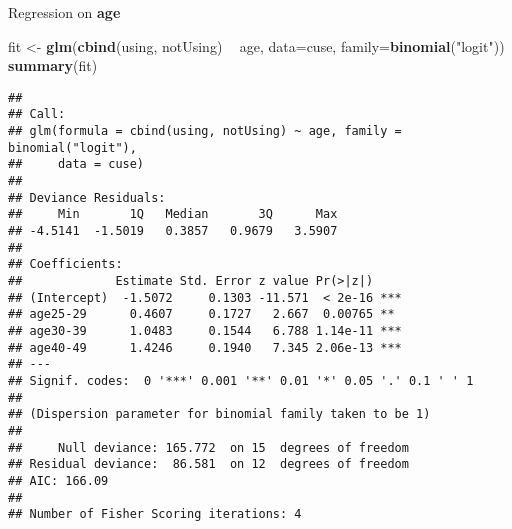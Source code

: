 \documentclass[
  ignorenonframetext,
]{beamer}
\newenvironment{Shaded}{\begin{snugshade}}{\end{snugshade}}
\newcommand{\DataTypeTok}[1]{\textcolor[rgb]{0.13,0.29,0.53}{#1}}
\newcommand{\KeywordTok}[1]{\textcolor[rgb]{0.13,0.29,0.53}{\textbf{#1}}}
\newcommand{\NormalTok}[1]{#1}
\newcommand{\OperatorTok}[1]{\textcolor[rgb]{0.81,0.36,0.00}{\textbf{#1}}}
\newcommand{\StringTok}[1]{\textcolor[rgb]{0.31,0.60,0.02}{#1}}
\begin{document}
\begin{frame}[fragile]{Regression on \textbf{age}}
\protect\hypertarget{regression-on-age-1}{}

\tiny

\begin{Shaded}
\begin{Highlighting}[]
\NormalTok{fit <-}\StringTok{ }\KeywordTok{glm}\NormalTok{(}\KeywordTok{cbind}\NormalTok{(using, notUsing) }\OperatorTok{~}\StringTok{ }\NormalTok{age, }
           \DataTypeTok{data=}\NormalTok{cuse, }\DataTypeTok{family=}\KeywordTok{binomial}\NormalTok{(}\StringTok{"logit"}\NormalTok{))}
\KeywordTok{summary}\NormalTok{(fit)}
\end{Highlighting}
\end{Shaded}

\begin{verbatim}
## 
## Call:
## glm(formula = cbind(using, notUsing) ~ age, family = binomial("logit"), 
##     data = cuse)
## 
## Deviance Residuals: 
##     Min       1Q   Median       3Q      Max  
## -4.5141  -1.5019   0.3857   0.9679   3.5907  
## 
## Coefficients:
##             Estimate Std. Error z value Pr(>|z|)    
## (Intercept)  -1.5072     0.1303 -11.571  < 2e-16 ***
## age25-29      0.4607     0.1727   2.667  0.00765 ** 
## age30-39      1.0483     0.1544   6.788 1.14e-11 ***
## age40-49      1.4246     0.1940   7.345 2.06e-13 ***
## ---
## Signif. codes:  0 '***' 0.001 '**' 0.01 '*' 0.05 '.' 0.1 ' ' 1
## 
## (Dispersion parameter for binomial family taken to be 1)
## 
##     Null deviance: 165.772  on 15  degrees of freedom
## Residual deviance:  86.581  on 12  degrees of freedom
## AIC: 166.09
## 
## Number of Fisher Scoring iterations: 4
\end{verbatim}

\end{frame}
\end{document}
